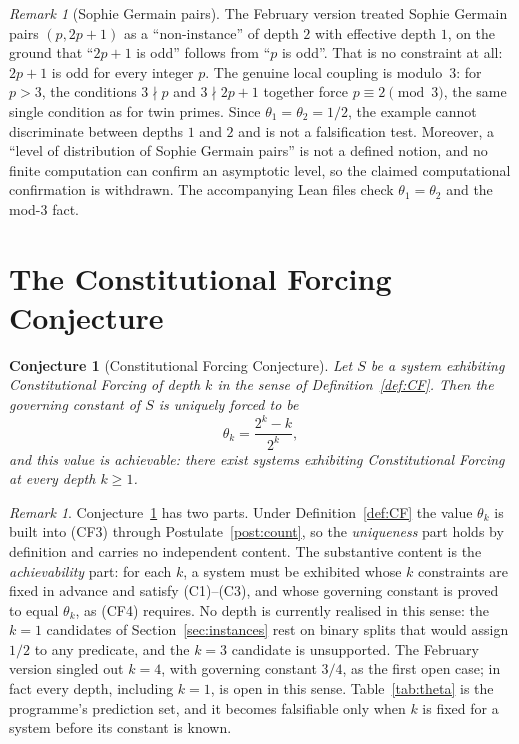 \documentclass[12pt]{amsart}
\theoremstyle{plain}
\newtheorem{conjecture}[theorem]{Conjecture}
\theoremstyle{definition}
\theoremstyle{remark}
\newtheorem{remark}[theorem]{Remark}
\newcommand{\thetak}{\theta_k}
\begin{document}
\begin{remark}[Sophie Germain pairs]
\label{rem:sophie}
The February version treated Sophie Germain pairs $(p, 2p+1)$ as a
``non-instance'' of depth $2$ with effective depth $1$, on the ground that
``$2p+1$ is odd'' follows from ``$p$ is odd''. That is no constraint at all:
$2p + 1$ is odd for every integer $p$. The genuine local coupling is
modulo~$3$: for $p > 3$, the conditions $3 \nmid p$ and $3 \nmid 2p+1$ together
force $p \equiv 2 \pmod 3$, the same single condition as for twin primes. Since
$\theta_1 = \theta_2 = 1/2$, the example cannot discriminate between depths $1$
and $2$ and is not a falsification test. Moreover, a ``level of distribution of
Sophie Germain pairs'' is not a defined notion, and no finite computation can
confirm an asymptotic level, so the claimed computational confirmation is
withdrawn. The accompanying Lean files check $\theta_1 = \theta_2$ and the
mod-$3$ fact.
\end{remark}

\section{The Constitutional Forcing Conjecture}
\label{sec:conjecture}

\begin{conjecture}[Constitutional Forcing Conjecture]
\label{conj:CF}
Let $S$ be a system exhibiting Constitutional Forcing of depth $k$ in the sense
of Definition~\ref{def:CF}. Then the governing constant of $S$ is uniquely
forced to be
\[
  \thetak = \frac{2^k - k}{2^k},
\]
and this value is achievable: there exist systems exhibiting Constitutional
Forcing at every depth $k \geq 1$.
\end{conjecture}

\begin{remark}
Conjecture~\ref{conj:CF} has two parts. Under Definition~\ref{def:CF} the value
$\thetak$ is built into (CF3) through Postulate~\ref{post:count}, so the
\emph{uniqueness} part holds by definition and carries no independent content.
The substantive content is the \emph{achievability} part: for each $k$, a
system must be exhibited whose $k$ constraints are fixed in advance and satisfy
(C1)--(C3), and whose governing constant is proved to equal $\thetak$, as (CF4)
requires. No depth is currently realised in this sense: the $k = 1$ candidates
of Section~\ref{sec:instances} rest on binary splits that would assign $1/2$ to
any predicate, and the $k = 3$ candidate is unsupported. The February version
singled out $k = 4$, with governing constant $3/4$, as the first open case; in
fact every depth, including $k = 1$, is open in this sense.
Table~\ref{tab:theta} is the programme's prediction set, and it becomes
falsifiable only when $k$ is fixed for a system before its constant is known.
\end{remark}
\end{document}
